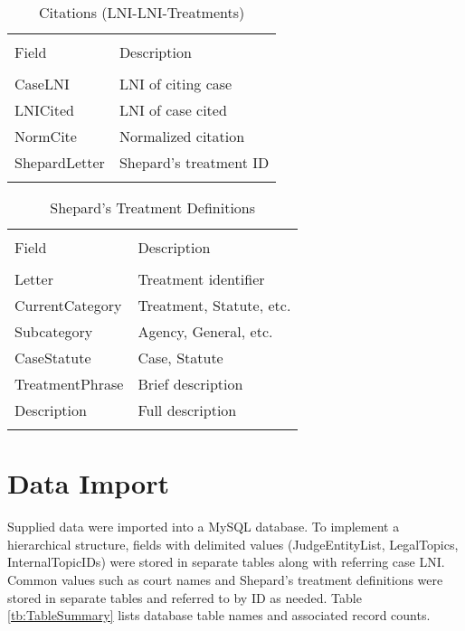 \documentclass[10pt, letterpaper]{article}
\begin{document}
\begin{spacing}{1.0}
\begin{table}[h!]
    \centering
    \caption{Citations (LNI-LNI-Treatments)}
    \begin{tabular}{ll}
        \hline\\[-8pt]
        Field & Description\\[2pt]
        \hline\\[-6pt]
        CaseLNI & LNI of citing case \\
        LNICited & LNI of case cited \\
        NormCite & Normalized citation \\
        ShepardLetter & Shepard's treatment ID \\[6pt]
        \hline\\[-6pt]
    \end{tabular}
    \label{tb:FileDescCitations}
\end{table}

\begin{table}[h!]
    \centering
    \caption{Shepard's Treatment Definitions}
    \begin{tabular}{ll}
        \hline\\[-8pt]
        Field & Description\\[2pt]
        \hline\\[-6pt]
        Letter & Treatment identifier \\
        CurrentCategory & Treatment, Statute, etc. \\
        Subcategory & Agency, General, etc. \\
        CaseStatute & Case, Statute \\
        TreatmentPhrase & Brief description \\
        Description & Full description \\[6pt]
        \hline\\[-6pt]
    \end{tabular}
    \label{tb:FileDescShepardTreatment}
\end{table}

\clearpage

\section{Data Import}

Supplied data were imported into a MySQL database.  To implement a hierarchical structure, fields with delimited values (JudgeEntityList, LegalTopics, InternalTopicIDs) were stored in separate tables along with referring case LNI.  Common values such as court names and Shepard's treatment definitions were stored in separate tables and referred to by ID as needed.  Table \ref{tb:TableSummary} lists database table names and associated record counts. 


\end{spacing}
\end{document}
